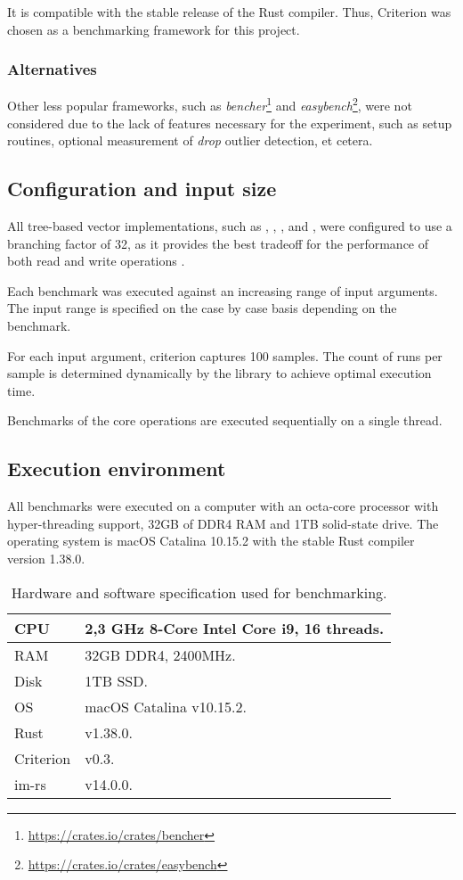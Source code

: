 It is compatible with the stable release of the Rust compiler. Thus, Criterion was chosen as a benchmarking framework for this project. 

\subsubsection*{Alternatives}
Other less popular frameworks, such as \emph{bencher}\footnote{\url{https://crates.io/crates/bencher}} and \emph{easybench}\footnote{\url{https://crates.io/crates/easybench}}, were not considered due to the lack of features necessary for the experiment, such as setup routines, optional measurement of \emph{drop} outlier detection, et cetera. 

\subsection{Configuration and input size}
All tree-based vector implementations, such as \rbvec{}, \rrbvec{}, \pvec{}, and \imrsvec{}, were configured to use a branching factor of 32, as it provides the best tradeoff for the performance of both read and write operations \cite{efficient-immutable-vectors}. 

Each benchmark was executed against an increasing range of input arguments. The input range is specified on the case by case basis depending on the benchmark. 

For each input argument, criterion captures 100 samples. The count of runs per sample is determined dynamically by the library to achieve optimal execution time. 

Benchmarks of the core operations are executed sequentially on a single thread. 

\subsection{Execution environment}
All benchmarks were executed on a computer with an octa-core processor with hyper-threading support, 32GB of DDR4 RAM and 1TB solid-state drive. The operating system is macOS Catalina 10.15.2 with the stable Rust compiler version 1.38.0.

\begin{table}[!htbp]
    \centering

    \begin{tabular} { |l| p{11cm} | }        
        \hline CPU & 2,3 GHz 8-Core Intel Core i9, 16 threads. \\ \hline
        RAM & 32GB DDR4, 2400MHz. \\ \hline
        Disk & 1TB SSD. \\ \hline
        OS & macOS Catalina v10.15.2. \\ \hline     
        Rust & v1.38.0. \\ \hline
        Criterion & v0.3. \\ \hline
        im-rs & v14.0.0. \\ \hline
    \end{tabular}
    
    \label{tab:exec-environment}
    \caption{Hardware and software specification used for benchmarking.}
\end{table}

